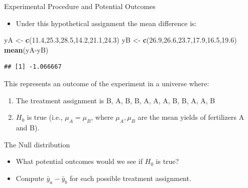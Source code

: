 \documentclass[10pt,ignorenonframetext,]{beamer}
\newenvironment{Shaded}{\begin{snugshade}}{\end{snugshade}}
\newcommand{\KeywordTok}[1]{\textcolor[rgb]{0.13,0.29,0.53}{\textbf{{#1}}}}
\newcommand{\FloatTok}[1]{\textcolor[rgb]{0.00,0.00,0.81}{{#1}}}
\newcommand{\StringTok}[1]{\textcolor[rgb]{0.31,0.60,0.02}{{#1}}}
\newcommand{\NormalTok}[1]{{#1}}
\providecommand{\tightlist}{%
\setlength{\itemsep}{0pt}\setlength{\parskip}{0pt}}
\begin{document}
\begin{frame}[fragile]{Experimental Procedure and Potential Outcomes}

\begin{itemize}
\tightlist
\item
  Under this hypothetical assignment the mean difference is:
\end{itemize}

\begin{Shaded}
\begin{Highlighting}[]
\NormalTok{yA <-}\StringTok{ }\KeywordTok{c}\NormalTok{(}\FloatTok{11.4}\NormalTok{,}\FloatTok{25.3}\NormalTok{,}\FloatTok{28.5}\NormalTok{,}\FloatTok{14.2}\NormalTok{,}\FloatTok{21.1}\NormalTok{,}\FloatTok{24.3}\NormalTok{)}
\NormalTok{yB <-}\StringTok{ }\KeywordTok{c}\NormalTok{(}\FloatTok{26.9}\NormalTok{,}\FloatTok{26.6}\NormalTok{,}\FloatTok{23.7}\NormalTok{,}\FloatTok{17.9}\NormalTok{,}\FloatTok{16.5}\NormalTok{,}\FloatTok{19.6}\NormalTok{)}
\KeywordTok{mean}\NormalTok{(yA-yB)}
\end{Highlighting}
\end{Shaded}

\begin{verbatim}
## [1] -1.066667
\end{verbatim}

This represents an outcome of the experiment in a universe where:

\begin{enumerate}
\def\labelenumi{\arabic{enumi}.}
\item
  The treatment assignment is B, A, B, B, A, A, A, B, B, A, A, B
\item
  \(H_0\) is true (i.e., \(\mu_A=\mu_B\), where \(\mu_A,\mu_B\) are the
  mean yields of fertilizers A and B).
\end{enumerate}

\end{frame}

\begin{frame}{The Null distribution}

\begin{itemize}
\tightlist
\item
  What potential outcomes would we see if \(H_0\) is true?
\item
  Compute \({\bar y}_a-{\bar y}_b\) for each possible treatment
  assignment.
\end{itemize}

\end{frame}
\end{document}
